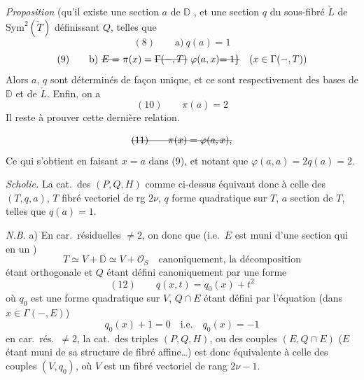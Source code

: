\documentclass[11pt,a4paper]{article}
\begin{document}
\emph{Proposition} (qu'il existe une  section $a$ de $\mathbb{D}$ \struck{\ill{}}, et une section $q$ du sous-fibré  $\check{L}$ de $\mathrm{Sym}^{2}(\check{T})$ définissant $Q$, telles que
\[
  (8) \qquad \text{a)}\ q(a) = 1
\]
\[
  (9) \qquad \text{b)}\ \text{\struck{$E =$}}\ \pi(x) = \text{\struck{$\Gamma(-,T)$}}\ \varphi(a,x) \text{\struck{$= 1\}$}}
  \quad (x \in \Gamma(-,T))
\]
Alors $a$, $q$ sont déterminés de façon unique, et ce sont respectivement des bases de $\mathbb{D}$ et de $\check{L}$. Enfin, on a
\[
  (10) \qquad \pi(a) = 2
\]
Il reste à prouver cette dernière relation. 

\[
  \text{\struck{$(11) \qquad \pi(x) = \varphi(a,x)$,}}
\]
Ce qui s'obtient en faisant $x = a$ dans (9), et notant que $\varphi(a,a) = 2q(a) = 2$.

\emph{Scholie.} La cat.\ des $(P, Q, H)$ comme ci-dessus équivaut donc à celle des $(T, q, a)$, $T$ fibré vectoriel de rg $2\nu$, $q$ forme quadratique  sur $T$, $a$ section de $T$, telles que $q(a) = 1$.

\emph{N.B.} a) En car.\ résiduelles $\neq 2$, on  donc que (i.e.\ $E$ est muni d'une section  qui en  un )
\[
  T \simeq V + \mathbb{D} \simeq V + \mathcal{O}_{S} \quad \text{canoniquement, la décomposition}
\]
étant orthogonale et $Q$ étant défini canoniquement par une forme
\[
  (12) \qquad q(x,t) = q_{0}(x) + t^{2}
\]
où $q_{0}$ est une forme quadratique sur $V$, $Q \cap E$ étant défini par l'équation (dans $x \in \Gamma(-, E)$)
\[
  q_{0}(x) + 1 = 0 \quad \text{i.e.} \quad q_{0}(x) = -1
\]
 en car.\ rés.\ $\neq 2$, la cat.\ des triples $(P, Q, H)$, ou des couples $(E, Q \cap E)$ ($E$ étant muni de sa structure de fibré affine…) est donc équivalente à celle des couples $(V, q_{0})$, où $V$ est un fibré vectoriel de rang $2\nu - 1$.
\end{document}
